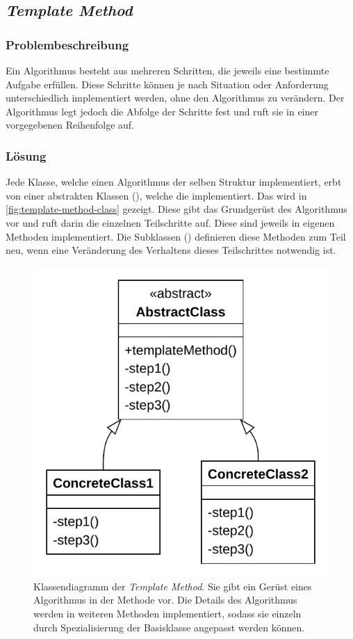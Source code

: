\subsection{\emph{Template Method}}

\subsubsection*{Problembeschreibung}

Ein Algorithmus besteht aus mehreren Schritten, die jeweils eine bestimmte Aufgabe erfüllen. Diese Schritte können je nach Situation oder Anforderung unterschiedlich implementiert werden, ohne den Algorithmus zu verändern. Der Algorithmus legt jedoch die Abfolge der Schritte fest und ruft sie in einer vorgegebenen Reihenfolge auf. \cite{gamma_design_1995}

\subsubsection*{Lösung}

Jede Klasse, welche einen Algorithmus der selben Struktur implementiert, erbt von einer abstrakten Klassen (), welche die  implementiert. Das wird in \autoref{fig:template-method-class} gezeigt. Diese gibt das Grundgerüst des Algorithmus vor und ruft darin die einzelnen Teilschritte auf. Diese sind jeweils in eigenen Methoden implementiert. Die Subklassen () definieren diese Methoden zum Teil neu, wenn eine Veränderung des Verhaltens dieses Teilschrittes notwendig ist.

\begin{figure}[!ht]
	\centering
	\includegraphics[width=0.75\linewidth]{images/patterns/template-method-class.pdf}
	\caption{Klassendiagramm der \emph{Template Method}. Sie gibt ein Gerüst eines Algorithmus in der Methode  vor. Die Details des Algorithmus werden in weiteren Methoden implementiert, sodass sie einzeln durch Spezialisierung der Basisklasse angepasst werden können. \cite{skobeleva_template_2023}}
	\label{fig:template-method-class}
\end{figure}

